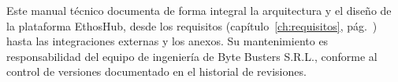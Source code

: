\bigskip
Este manual técnico documenta de forma integral la arquitectura y el diseño de la
plataforma EthosHub, desde los requisitos (capítulo~\ref{ch:requisitos},
pág.~\pageref{ch:requisitos}) hasta las integraciones externas y los anexos. Su
mantenimiento es responsabilidad del equipo de ingeniería de Byte Busters S.R.L., conforme
al control de versiones documentado en el historial de revisiones.

\label{ultima-pagina}
